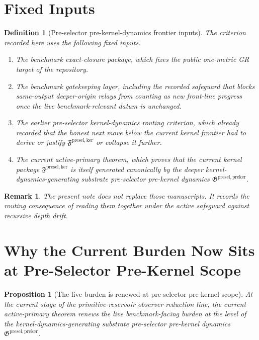\documentclass[11pt]{article}
\newcommand{\PreKernelPackage}{\mathfrak G^{\mathrm{presel,preker}}}
\newcommand{\KernelPackage}{\mathfrak F^{\mathrm{presel,ker}}}
\newtheorem{definition}{Definition}
\newtheorem{proposition}{Proposition}
\newtheorem{remark}{Remark}
\begin{document}
\section{Fixed Inputs}

\begin{definition}[Pre-selector pre-kernel-dynamics frontier inputs]
The criterion recorded here uses the following fixed inputs.
\begin{enumerate}
    \item The benchmark exact-closure package, which fixes the public one-metric GR target of the repository.
    \item The benchmark gatekeeping layer, including the recorded safeguard that blocks same-output deeper-origin relays from counting as new front-line progress once the live benchmark-relevant datum is unchanged.
    \item The earlier pre-selector kernel-dynamics routing criterion, which already recorded that the honest next move below the current kernel frontier had to derive or justify \(\KernelPackage\) or collapse it further.
    \item The current active-primary theorem, which proves that the current kernel package \(\KernelPackage\) is itself generated canonically by the deeper kernel-dynamics-generating substrate pre-selector pre-kernel dynamics \(\PreKernelPackage\).
\end{enumerate}
\end{definition}

\begin{remark}
The present note does not replace those manuscripts. It records the routing consequence of reading them together under the active safeguard against recursive depth drift.
\end{remark}

\section{Why the Current Burden Now Sits at Pre-Selector Pre-Kernel Scope}

\begin{proposition}[The live burden is renewed at pre-selector pre-kernel scope]
At the current stage of the primitive-reservoir observer-reduction line, the current active-primary theorem renews the live benchmark-facing burden at the level of the kernel-dynamics-generating substrate pre-selector pre-kernel dynamics \(\PreKernelPackage\).
\end{proposition}
\end{document}
